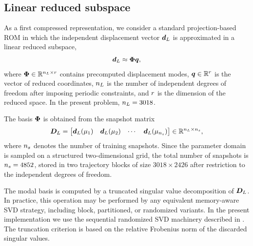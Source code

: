 \documentclass[11pt,a4paper]{article}
\newcommand{\PROMPT}[1]{ }
\begin{document}
\PROMPT{}


\subsection{Linear reduced subspace}
\label{subsec:linear_reduced_subspace}

As a first compressed representation, we consider a standard projection-based ROM in which
the independent displacement vector $\bm{d}_L$ is approximated in a linear reduced subspace,
\begin{equation}
    \bm{d}_L \approx \bm{\Phi} \bm{q} ,
    \label{eq:standard_ROM_expansion}
\end{equation}
where $\bm{\Phi}\in\mathbb{R}^{n_L\times r}$ contains precomputed displacement modes,
$\bm{q}\in\mathbb{R}^{r}$ is the vector of reduced coordinates, $n_L$ is the number of
independent degrees of freedom after imposing periodic constraints, and $r$ is the
dimension of the reduced space. In the present problem, $n_L=3018$.

The basis $\bm{\Phi}$ is obtained from the snapshot matrix
\begin{equation}
\label{eq:Dmatrix}
    \bm{D}_L =
    \begin{bmatrix}
    \bm{d}_L(\mu_1) & \bm{d}_L(\mu_2) & \cdots & \bm{d}_L(\mu_{n_s})
    \end{bmatrix}
    \in\mathbb{R}^{n_L\times n_s},
\end{equation}
where $n_s$ denotes the number of training snapshots. Since the parameter domain is
sampled on a structured two-dimensional grid, the total number of snapshots is
$n_s=4852$, stored in two trajectory blocks of size $3018\times2426$ after restriction to
the independent degrees of freedom.

The modal basis is computed by a truncated singular value decomposition of $\bm{D}_L$.
In practice, this operation may be performed by any equivalent memory-aware SVD strategy,
including block, partitioned, or randomized variants. In the present implementation we use the
sequential randomized SVD machinery described in \cite{hernandez2024cecm}. The truncation
criterion is based on the relative Frobenius norm of the discarded singular values.

\end{document}
